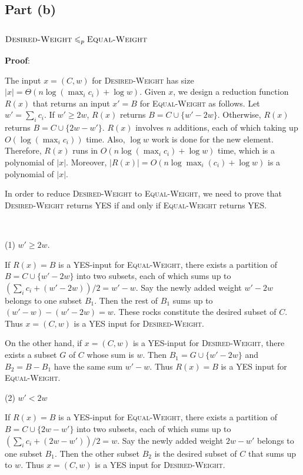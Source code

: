 \documentclass{article}
\begin{document}
\subsection{Part (b)}
\subsubsection{$\textsc{Desired-Weight}\leqslant_p\textsc{Equal-Weight}$}
\noindent\textbf{Proof}:

The input $x=(C,w)$ for \textsc{Desired-Weight} has size $|x|=\Theta(n\log(\max_ic_i)+\log w)$. Given $x$, we design a reduction function $R(x)$ that returns an input $x'=B$ for \textsc{Equal-Weight} as follows. Let $w'=\sum_ic_i$. If $w'\geqslant2w$, $R(x)$ returns $B=C\cup\{w'-2w\}$. Otherwise, $R(x)$ returns $B=C\cup\{2w-w'\}$. $R(x)$ involves $n$ additions, each of which taking up $O(\log(\max_ic_i))$ time. Also, $\log w$ work is done for the new element. Therefore, $R(x)$ runs in $O(n\log(\max_ic_i)+\log w)$ time, which is a polynomial of $|x|$. Moreover, $|R(x)|=O(n\log\max_i(c_i)+\log w)$ is a polynomial of $|x|$.

In order to reduce \textsc{Desired-Weight} to \textsc{Equal-Weight}, we need to prove that \textsc{Desired-Weight} returns YES if and only if \textsc{Equal-Weight} returns YES.

~

\noindent(1) $w'\geqslant2w$.

If $R(x)=B$ is a YES-input for \textsc{Equal-Weight}, there exists a partition of $B=C\cup\{w'-2w\}$ into two subsets, each of which sums up to $(\sum_ic_i+(w'-2w))/2=w'-w$. Say the newly added weight $w'-2w$ belongs to one subset $B_1$. Then the rest of $B_1$ sums up to $(w'-w)-(w'-2w)=w$. These rocks constitute the desired subset of $C$. Thus $x=(C,w)$ is a YES input for \textsc{Desired-Weight}.

On the other hand, if $x=(C,w)$ is a YES-input for \textsc{Desired-Weight}, there exists a subset $G$ of $C$ whose sum is $w$. Then $B_1=G\cup\{w'-2w\}$ and $B_2=B-B_1$ have the same sum $w'-w$. Thus $R(x)=B$ is a YES input for \textsc{Equal-Weight}.

\noindent(2) $w'<2w$

If $R(x)=B$ is a YES-input for \textsc{Equal-Weight}, there exists a partition of $B=C\cup\{2w-w'\}$ into two subsets, each of which sums up to $(\sum_ic_i+(2w-w'))/2=w$. Say the newly added weight $2w-w'$ belongs to one subset $B_1$. Then the other subset $B_2$ is the desired subset of $C$ that sums up to $w$. Thus $x=(C,w)$ is a YES input for \textsc{Desired-Weight}.
\end{document}
